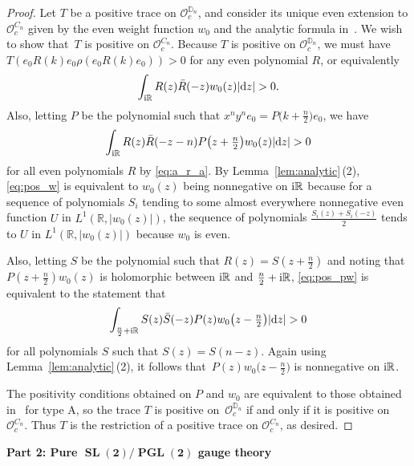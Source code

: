 \documentclass[pdftex]{sigma}
\newcommand\RR{\mathbb{R}}
\newcommand\DD{\mathbb{D}}
\newcommand\cO{\mathcal{O}}
\DeclareMathOperator\SL{SL}
\renewcommand\d{\mathrm{d}}
\newcommand\R{\bar{R}}
\renewcommand\S{\bar{S}}
\newcommand{\PGL}{\operatorname{PGL}}
\numberwithin{equation}{section}
\theoremstyle{definition}
\begin{document}
\begin{proof}
 Let $T$ be a positive trace on $\cO_c^{\DD_n}$,
 and consider its unique even extension to $\cO_c^{C_n}$
 given by the even weight function $w_0$
 and the analytic formula
 in~\cite[Proposition~3.1]{etingof2021twisted}.
 We wish to show that~$T$ is positive on $\cO_c^{C_n}$.
 Because $T$ is positive on $\cO_c^{\DD_n}$,
 we must have $T(e_0 R(k) e_0 \rho(e_0 R(k) e_0)) > 0$
 for any even polynomial $R$,
 or equivalently
 \begin{equation}
 \label{eq:pos_w}
 \int_{{\rm i}\RR} R(z) \R(-z) w_0(z) |\d z| > 0.
 \end{equation}
 Also, letting $P$ be the polynomial such that
 $x^n y^n e_0 = P\bigl(k + \frac{n}{2}\bigr) e_0$,
 we have
 \begin{equation}
 \label{eq:pos_pw}
 \int_{{\rm i}\RR} R(z) \R(-z - n) P\bigl(z + \tfrac{n}{2}\bigr) w_0(z) |\d z|
 > 0
 \end{equation}
 for all even polynomials $R$ by \eqref{eq:a_r_a}.
 By Lemma~\ref{lem:analytic}\,(2),
 \eqref{eq:pos_w} is equivalent to $w_0 (z)$
 being nonnegative on ${\rm i}\RR$ because
 for a sequence of polynomials $S_i$ tending to
 some almost everywhere nonnegative even function $U$
 in $L^1(\RR, |w_0(z)|)$,
 the sequence of polynomials $\frac{S_i(z) + S_i(-z)}{2}$
 tends to $U$ in $L^1(\RR, |w_0(z)|)$
 because $w_0$ is even.

 Also, letting $S$ be the polynomial such that
 $R(z) = S(z + \frac{n}{2})$
 and noting that $P(z + \frac{n}{2}) w_0(z)$ is holomorphic
 between ${\rm i}\RR$ and $\frac{n}{2} + {\rm i}\RR$,
 \eqref{eq:pos_pw} is equivalent to the statement that
 \begin{equation*}
 \int_{\frac{n}{2} + {\rm i}\RR}
 S(z) \S(-z) P(z) w_0 \bigl(z - \tfrac{n}{2}\bigr) |\d z| > 0
 \end{equation*}
 for all polynomials $S$ such that $S(z) = S(n - z)$.
 Again using Lemma~\ref{lem:analytic}\,(2),
 it follows that~${P(z) w_0\bigl(z - \frac{n}{2}\bigr)}$ is nonnegative
 on ${\rm i}\RR$.

 The positivity conditions obtained on $P$ and $w_0$
 are equivalent to those obtained
 in~\cite[Proposition~4.20]{etingof2021twisted} for type A,
 so the trace $T$ is positive on~$\cO_c^{\DD_n}$
 if and only if it is positive on~$\cO_c^{C_n}$.
 Thus $T$ is the restriction of a positive trace on $\cO_c^{C_n}$,
 as desired.
\end{proof}

\begin{center}
 {\huge \bf Part 2: Pure $\boldsymbol{\SL(2)/\PGL(2)}$ gauge theory}
\end{center}
\end{document}
